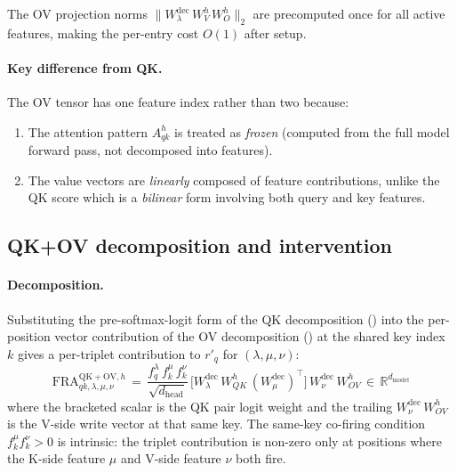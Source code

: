 \documentclass{article}
\theoremstyle{plain}
\theoremstyle{definition}
\theoremstyle{remark}
\newcommand{\Wdec}{W^{\mathrm{dec}}}
\newcommand{\WV}{W_V}
\newcommand{\WO}{W_O}
\newcommand{\WOV}{W_{OV}}
\newcommand{\WQK}{W_{QK}}
\newcommand{\dmodel}{d_{\mathrm{model}}}
\newcommand{\dhead}{d_{\mathrm{head}}}
\newcommand{\RR}{\mathbb{R}}
\begin{document}
The OV projection norms $\| \Wdec_\lambda\,\WV^h\,\WO^h \|_2$ are precomputed once for all active features, making the per-entry cost $O(1)$ after setup.

\paragraph{Key difference from QK.} The OV tensor has one feature index rather than two because:
\begin{enumerate}
    \item The attention pattern $A^h_{qk}$ is treated as \emph{frozen} (computed from the full model forward pass, not decomposed into features).
    \item The value vectors are \emph{linearly} composed of feature contributions, unlike the QK score which is a \emph{bilinear} form involving both query and key features.
\end{enumerate}

\subsection{QK+OV decomposition and intervention}
\label{app:qkov_derivation}

\paragraph{Decomposition.} Substituting the pre-softmax-logit form of the QK decomposition () into the per-position vector contribution of the OV decomposition () at the shared key index $k$ gives a per-triplet contribution to $r'_q$ for $(\lambda, \mu, \nu)$:
\begin{equation}
    \mathrm{FRA}^{\mathrm{QK{+}OV}, h}_{qk, \lambda, \mu, \nu} \,=\, \frac{f_q^\lambda\, f_k^\mu\, f_k^\nu}{\sqrt{\dhead}}\, \big[\Wdec_\lambda\, \WQK^h\, (\Wdec_\mu)^\top\big]\, \Wdec_\nu\, \WOV^h \,\in\, \RR^{\dmodel}
\end{equation}
where the bracketed scalar is the QK pair logit weight and the trailing $\Wdec_\nu\, \WOV^h$ is the V-side write vector at that same key. The same-key co-firing condition $f_k^\mu f_k^\nu > 0$ is intrinsic: the triplet contribution is non-zero only at positions where the K-side feature $\mu$ and V-side feature $\nu$ both fire.
\end{document}

